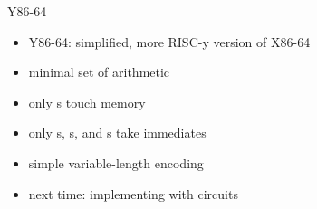 \begin{frame}{Y86-64}
\begin{itemize}
    \item Y86-64: simplified, more RISC-y version of X86-64
    \item minimal set of arithmetic
    \item only s touch memory
    \item only s, s, and s take immediates
    \item simple variable-length encoding
    \vspace{.5cm}
    \item next time: implementing with circuits
\end{itemize}
\end{frame}

